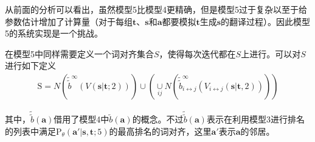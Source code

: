 \begin{appendices}
\parinterval 从前面的分析可以看出，虽然模型5比模型4更精确，但是模型5过于复杂以至于给参数估计增加了计算量（对于每组$\mathbf{t}$、$\mathbf{s}$和$\mathbf{a}$都要模拟$\mathbf{t}$生成$\mathbf{s}$的翻译过程）。因此模型5的系统实现是一个挑战。

\parinterval 在模型5中同样需要定义一个词对齐集合$S$，使得每次迭代都在$S$上进行。可以对$S$进行如下定义
\begin{eqnarray}
\textrm{S} = N(\tilde{\tilde{b}}^{\infty}(V(\mathbf{s}|\mathbf{t};2))) \cup (\mathop{\cup}\limits_{ij} N(\tilde{\tilde{b}}_{i \leftrightarrow j}^{\infty}(V_{i \leftrightarrow j}(\mathbf{s}|\mathbf{t},2))))
\label{eq:1.29}
\end{eqnarray}
\vspace{0.5em}

\noindent 其中，$\tilde{\tilde{b}}(\mathbf{a})$借用了模型4中$\tilde{b}(\mathbf{a})$的概念。不过$\tilde{\tilde{b}}(\mathbf{a})$表示在利用模型3进行排名的列表中满足$\textrm{P}_{\theta}(\mathbf{a}'|\mathbf{s},\mathbf{t};5)$的最高排名的词对齐，这里$\mathbf{a}'$表示$\mathbf{a}$的邻居。
\end{appendices}














